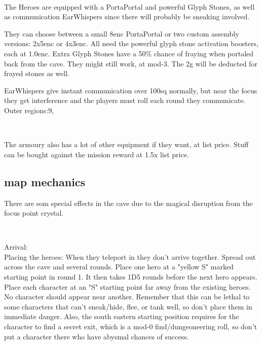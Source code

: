 \

\noindent
The Heroes are equipped with a PortaPortal and powerful Glyph Stones, as well as communication EarWhispers since there will probably be sneaking involved.

They can choose between a small 8enc PortaPortal or two custom assembly versions: 2x5enc or 4x3enc. All need the powerful glyph stone activation boosters, each at 1.0enc. Extra Glyph Stones have a 50\% chance of fraying when portaled back from the cave. They might still work, at mod-3. The 2g will be deducted for frayed stones as well.

EarWhispers give instant communication over 100sq normally, but near the focus they get interference and the players must roll each round they communicate. Outer regions:9,

\

The armoury also has a lot of other equipment if they want, at list price. Stuff can be bought against the mission reward at 1.5x list price.





\subsection*{map mechanics}
There are som special effects in the cave due to the magical disruption from the focus point crystal.

\

Arrival:\\
Placing the heroes: When they teleport in they don't arrive together. Spread out across the cave and several rounds. Place one hero at a "yellow S" marked starting point in round 1. It then takes 1D5 rounds before the next hero appears. Place each character at an "S" starting point far away from the existing heroes. No character should appear near another.
Remember that this can be lethal to some characters that can't sneak/hide, flee, or tank well, so don't place them in immediate danger. Also, the south eastern starting position requires for the character to find a secret exit, which is a mod-0 find/dungeoneering roll, so don't put a character there who have abysmal chances of success.

\

